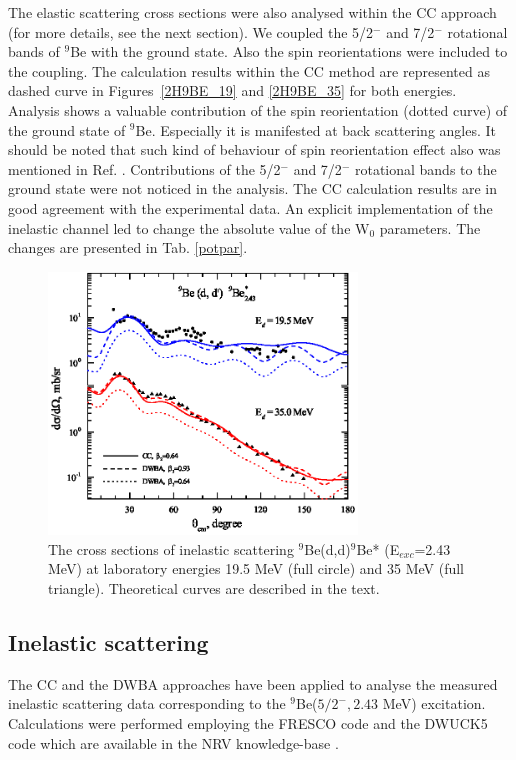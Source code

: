 \documentclass[10pt]{iopart}
\begin{document}
The elastic scattering cross sections were also analysed within the CC approach (for more details, see the next section). 
We coupled the 5/2$^{-}$ and 7/2$^-$ rotational bands of $^9$Be with the ground state. Also the spin reorientations were included to the coupling.
The calculation results within the CC method are represented as dashed curve in Figures~\ref{2H9BE_19} and \ref{2H9BE_35} for both energies.
Analysis shows a valuable contribution of the spin reorientation (dotted curve) of the ground state of $^9$Be. 
Especially it is manifested at back scattering angles. It should be noted that such kind of behaviour of spin reorientation effect also was mentioned in Ref. \cite{rudchik2016}. 
Contributions of the 5/2$^{-}$ and 7/2$^-$ rotational bands to the ground state were not noticed in the analysis.
The CC calculation results are in good agreement with the experimental data.  
An explicit implementation of the inelastic channel led to change the absolute value of the W$_0$ parameters. 
The changes are presented in Tab. \ref{potpar}.



\begin{figure}[tp]
\centering
\includegraphics[width=8.2cm]{2H9BE2430MEV.eps}
\caption{\label{2H9BE2430MEV}The cross sections of inelastic scattering ${}^9$Be(d,d)$^9$Be* (E$_{exc}$=2.43 MeV) at laboratory energies 19.5 MeV (full circle) and 35 MeV (full triangle). Theoretical curves are described in the text.}
\end{figure}

\subsection{Inelastic scattering}
The CC and the DWBA approaches have been applied to analyse the measured inelastic scattering data corresponding to the ${}^9$Be($5/2^-, 2.43$ MeV) excitation. Calculations were performed employing the FRESCO code \cite{fresco} and the DWUCK5 code \cite{kunz} which are available in the NRV knowledge-base \cite{nrv}.
\end{document}
